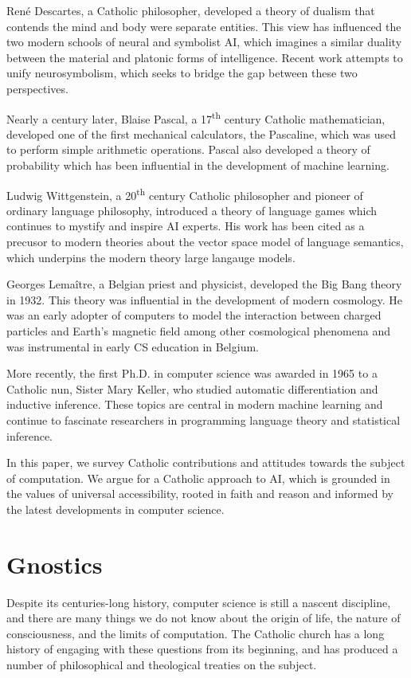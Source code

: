 \documentclass[sigplan,nonacm]{acmart}\settopmatter{printfolios=false,printccs=false,printacmref=false}
\begin{document}
  Ren\'e Descartes, a Catholic philosopher, developed a theory of dualism that contends the mind and body were separate entities. This view has influenced the two modern schools of neural and symbolist AI, which imagines a similar duality between the material and platonic forms of intelligence. Recent work attempts to unify neurosymbolism, which seeks to bridge the gap between these two perspectives.

  Nearly a century later, Blaise Pascal, a 17\textsuperscript{th} century Catholic mathematician, developed one of the first mechanical calculators, the Pascaline, which was used to perform simple arithmetic operations. Pascal also developed a theory of probability which has been influential in the development of machine learning.

  Ludwig Wittgenstein, a 20\textsuperscript{th} century Catholic philosopher and pioneer of ordinary language philosophy, introduced a theory of language games which continues to mystify and inspire AI experts. His work has been cited as a precusor to modern theories about the vector space model of language semantics, which underpins the modern theory large langauge models.

  Georges Lema\^itre, a Belgian priest and physicist, developed the Big Bang theory in 1932. This theory was influential in the development of modern cosmology. He was an early adopter of computers to model the interaction between charged particles and Earth's magnetic field among other cosmological phenomena and was instrumental in early CS education in Belgium.

  More recently, the first Ph.D. in computer science was awarded in 1965 to a Catholic nun, Sister Mary Keller, who studied automatic differentiation and inductive inference. These topics are central in modern machine learning and continue to fascinate researchers in programming language theory and statistical inference.

  In this paper, we survey Catholic contributions and attitudes towards the subject of computation. We argue for a Catholic approach to AI, which is grounded in the values of universal accessibility, rooted in faith and reason and informed by the latest developments in computer science.

 \section{Gnostics}

  Despite its centuries-long history, computer science is still a nascent discipline, and there are many things we do not know about the origin of life, the nature of consciousness, and the limits of computation. The Catholic church has a long history of engaging with these questions from its beginning, and has produced a number of philosophical and theological treaties on the subject.
\end{document}
